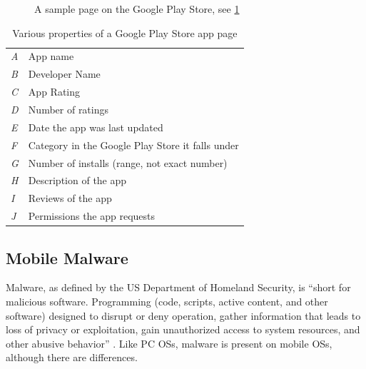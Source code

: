 \documentclass{acm_proc_article-sp}
\begin{document}

\begin{figure}[h]
\begin{center}
\caption{A sample page on the Google Play Store, see \ref{tab:gpstorekey}}
\label{fig:gpstoreapps}
\end{center}
\end{figure}

\begin{table}[h]
\begin{small}
\begin{tabular}{l|l}

\textit{A} & App name  \\
\textit{B} & Developer Name  \\
\textit{C} & App Rating  \\
\textit{D} & Number of ratings  \\
\textit{E} & Date the app was last updated  \\
\textit{F} & Category in the Google Play Store it falls under  \\
\textit{G} & Number of installs (range, not exact number)  \\
\textit{H} & Description of the app  \\
\textit{I} & Reviews of the app  \\
\textit{J} & Permissions the app requests  \\

\end{tabular}
\end{small}
\caption{Various properties of a Google Play Store app page}
\label{tab:gpstorekey}
\end{table}


\subsection{Mobile Malware}
Malware, as defined by the US Department of Homeland Security, is ``short for malicious software. Programming (code, scripts, active content, and other software) designed to disrupt or deny operation, gather information that leads to loss of privacy or exploitation, gain unauthorized access to system resources, and other abusive behavior'' \citep{nash2005undirected}. Like PC OSs, malware is present on mobile OSs, although there are differences.
\end{document}
